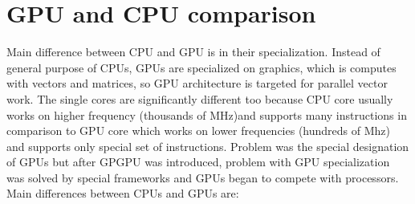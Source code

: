 \section{GPU and CPU comparison} \label{ssec:gpucpucomparison}
Main difference between CPU and GPU is in their specialization. Instead of general purpose of CPUs, GPUs are specialized on graphics, which is computes with vectors and matrices, so GPU architecture is targeted for parallel vector work. The single cores are significantly different too because CPU core usually works on higher frequency (thousands of MHz)and supports many instructions in comparison to GPU core which works on lower frequencies (hundreds of Mhz) and supports only special set of instructions. Problem was the special designation of GPUs but after GPGPU was introduced, problem with GPU specialization was solved by special frameworks and GPUs began to compete with processors. Main differences between CPUs and GPUs are:
